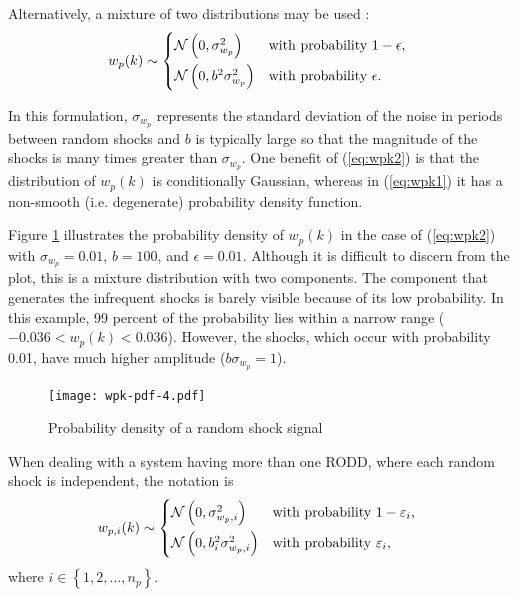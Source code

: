 Alternatively, a mixture of two distributions may be used \citep{robertson_detection_1995}:
\begin{equation} \label{eq:wpk2}
w_p(k) \sim 
	\begin{cases*}
		\mathcal{N}\left(0, \sigma_{w_p}^2\right) & with probability $1-\epsilon$, \\
		\mathcal{N}\left(0, b^2\sigma_{w_p}^2\right) & with probability $\epsilon$.
	\end{cases*}
\end{equation}
%
%

In this formulation, $\sigma_{w_p}$ represents the standard deviation of the noise in periods between random shocks and $b$ is typically large so that the magnitude of the shocks is many times greater than $\sigma_{w_p}$. One benefit of (\ref{eq:wpk2}) is that the distribution of $w_p(k)$ is conditionally Gaussian, whereas in (\ref{eq:wpk1}) it has a non-smooth (i.e. degenerate) probability density function.

Figure \ref{fig:wpk-pdf} illustrates the probability density of $w_p(k)$ in the case of (\ref{eq:wpk2}) with $\sigma_{w_p}=0.01$, $b=100$, and $\epsilon=0.01$. Although it is difficult to discern from the plot, this is a mixture distribution with two components. The component that generates the infrequent shocks is barely visible because of its low probability. In this example, 99 percent of the probability lies within a narrow range ($-0.036 < w_p(k) < 0.036$). However, the shocks, which occur with probability 0.01, have much higher amplitude ($b\sigma_{w_p}=1$).

\begin{figure}[ht]
	\centering
	\texttt{[image: wpk-pdf-4.pdf]}
	\caption{Probability density of a random shock signal}
	\label{fig:wpk-pdf}
\end{figure}

When dealing with a system having more than one \gls{RODD}, where each random shock is independent, the notation is
\begin{equation} \label{eq:wpik2}
	w_{p,i}(k) \sim 
	\begin{cases*}
		\mathcal{N}\left(0, \sigma_{w_p,i}^2\right) & with probability $1-\varepsilon_i$, \\
		\mathcal{N}\left(0, b_i^2\sigma_{w_p,i}^2\right) & with probability $\varepsilon_i$,
	\end{cases*}
\end{equation}
where $i \in \left\{1, 2, ..., n_p\right\}$.
%

